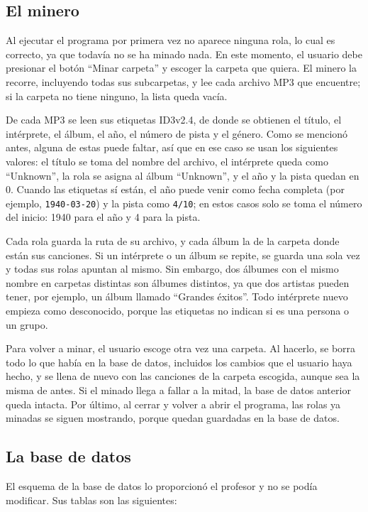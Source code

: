\documentclass[12pt,letterpaper]{article}
\begin{document}
\subsection{El minero}

Al ejecutar el programa por primera vez no aparece ninguna rola, lo cual
es correcto, ya que todavía no se ha minado nada. En este momento, el
usuario debe presionar el botón ``Minar carpeta'' y escoger la carpeta que
quiera. El minero la recorre, incluyendo todas sus subcarpetas, y lee cada
archivo MP3 que encuentre; si la carpeta no tiene ninguno, la lista queda
vacía.

De cada MP3 se leen sus etiquetas ID3v2.4, de donde se obtienen el título,
el intérprete, el álbum, el año, el número de pista y el género. Como se
mencionó antes, alguna de estas puede faltar, así que en ese caso se usan
los siguientes valores: el título se toma del nombre del archivo, el
intérprete queda como ``Unknown'', la rola se asigna al álbum
``Unknown'', y el año y la pista quedan en 0. Cuando las etiquetas sí
están, el año puede venir como fecha completa (por ejemplo,
\texttt{1940-03-20}) y la pista como \texttt{4/10}; en estos casos solo se
toma el número del inicio: 1940 para el año y 4 para la pista.

Cada rola guarda la ruta de su archivo, y cada álbum la de la carpeta
donde están sus canciones. Si un intérprete o un álbum se repite, se
guarda una sola vez y todas sus rolas apuntan al mismo. Sin embargo, dos
álbumes con el mismo nombre en carpetas distintas son álbumes distintos,
ya que dos artistas pueden tener, por ejemplo, un álbum llamado ``Grandes
éxitos''. Todo intérprete nuevo empieza como desconocido, porque las
etiquetas no indican si es una persona o un grupo.

Para volver a minar, el usuario escoge otra vez una carpeta. Al hacerlo,
se borra todo lo que había en la base de datos, incluidos los cambios que
el usuario haya hecho, y se llena de nuevo con las canciones de la carpeta
escogida, aunque sea la misma de antes. Si el minado llega a fallar a la
mitad, la base de datos anterior queda intacta. Por último, al cerrar y
volver a abrir el programa, las rolas ya minadas se siguen mostrando,
porque quedan guardadas en la base de datos.

\subsection{La base de datos}

El esquema de la base de datos lo proporcionó el profesor y no se podía
modificar. Sus tablas son las siguientes:
\end{document}
